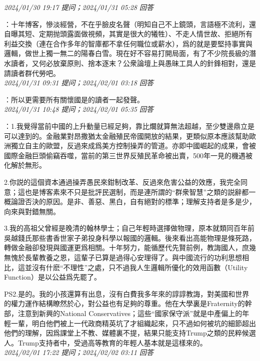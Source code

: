 \documentclass[twocolumn]{ctexart}
\begin{document}
\textit{\hfill\noindent\small 2024/01/30 19:17 提问；2024/01/31 05:28 回答}

：十年博客，慘淡經營，不在乎臉皮名聲（明知自己不上鏡頭，言語極不流利，還自曝其短、定期抛頭露面做視頻，其實是很大的犧牲）、不走人情世故、拒絕所有利益交換（連在合作多年的智庫都不拿任何職位或薪水），爲的就是要堅持事實與邏輯，做世上獨一無二的陽春白雪。現在好不容易打開局面，有了不少院長級的潛水讀者，又何必放棄原則、捨本逐末？公衆論壇上與愚昧工具人的針鋒相對，還是請讀者群代勞吧。
\\

\textit{\hfill\noindent\small 2024/01/31 09:31 提问；2024/02/01 03:18 回答}

：所以更需要所有關懷國是的讀者一起發聲。
\\

\textit{\hfill\noindent\small 2024/01/31 10:48 提问；2024/02/01 05:35 回答}

：1.我覺得當前中國的上升動量已經足夠，靠比爛就算無法超越，至少雙邊鼎立是可以達到的。金融業對昂撒猶太金融殖民帝國開放的結果，更類似原本應該幫助歐洲獨立自主的歐盟，反過來成爲美方控制操弄的管道。亦即中國崛起的成果，會被國際金融巨頭偷竊吞噬，當前的第三世界反殖民革命被出賣，500年一見的機遇被化解於無形。

2.你説的這個資本通過操弄愚民來鉗制改革、反過來危害公益的效應，我完全同意；這也是博客素來不只是批評民選制，而是連所謂的“群衆智慧”之類的説辭都一概論證否決的原因。是非、善惡、黑白，自有絕對的標準；理解支持者是多是少，向來與對錯無關。

3.我的高祖父曾經是晚清的翰林學士；自己年輕時選擇做物理，原本就類同百年前吳越錢氏那些書香世家子弟投身科學以報國的邏輯。後來看出高能物理是條死路，轉做金融卻發現與國運更爲相關。十年努力，能循歷代先賢前例，教誨國人，庶幾無愧於長輩教養之恩，這輩子已算是過得心安理得了。與中國流行的功利思想相比，這並沒有什麽“不理性”之處，只不過我人生邏輯所優化的效用函數（Utility Function）是以公益爲先罷了。

PS2.是的。我的小孩還算有出息，沒有白費我多年來的諄諄教誨，對美國和世界的權力運作結構瞭然於心，對公益也有足夠的尊重。他在大學裏是Fraternity的幹部，注意到新興的National Conservatives；這些“國家保守派”就是中產偏上的年輕一輩，明白他們被上一代政商精英坑了才組織起來，只不過如何被坑的細節超出他們的理解，因爲課堂上不教、媒體裏不提，結果只能支持Trump之類的民粹候選人。Trump支持者中，受過高等教育的年輕人基本就是這樣來的。
\\

\textit{\hfill\noindent\small 2024/02/01 17:22 提问；2024/02/02 03:11 回答}
\end{document}
